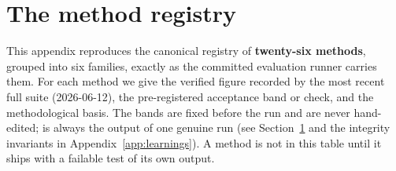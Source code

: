 \section{The method registry}
\label{app:registry}

This appendix reproduces the canonical registry of \textbf{twenty-six methods},
grouped into six families, exactly as the committed evaluation runner
 carries them. For each method we give the
verified figure recorded by the most recent full suite (2026-06-12), the
pre-registered acceptance band or check, and the methodological basis. The bands
are fixed before the run and are never hand-edited;  is always
the output of one genuine run (see Section~\ref{app:registry} and the integrity
invariants in Appendix~\ref{app:learnings}). A method is not in this table until
it ships with a failable test of its own output.

